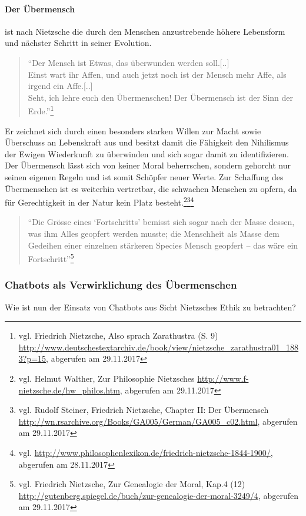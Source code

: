 \paragraph{Der Übermensch} ist nach Nietzsche die durch den Menschen anzustrebende höhere Lebensform und nächster Schritt in seiner Evolution.
\begin{quote}
\enquote{Der Mensch ist Etwas, das überwunden werden soll.[..]\\
Einst wart ihr Affen, und auch jetzt noch ist der Mensch mehr Affe, als irgend ein Affe.[..]\\
Seht, ich lehre euch den Übermenschen! Der Übermensch ist der Sinn der Erde.}\footnote{vgl. Friedrich Nietzsche, Also sprach Zarathustra (S. 9) \url{http://www.deutschestextarchiv.de/book/view/nietzsche_zarathustra01_1883?p=15}, abgerufen am 29.11.2017}
\end{quote}
Er zeichnet sich durch einen besonders starken Willen zur Macht sowie Überschuss an Lebenskraft aus und besitzt damit die Fähigkeit den Nihilismus der Ewigen Wiederkunft zu überwinden und sich sogar damit zu identifizieren.
Der Übermensch lässt sich von keiner Moral beherrschen, sondern gehorcht nur seinen eigenen Regeln und ist somit Schöpfer neuer Werte.
Zur Schaffung des Übermenschen ist es weiterhin vertretbar, die schwachen Menschen zu opfern, da für Gerechtigkeit in der Natur kein Platz besteht.\footnote{vgl. Helmut Walther, Zur Philosophie Nietzsches \url{http://www.f-nietzsche.de/hw_philos.htm}, abgerufen am 29.11.2017}\footnote{vgl. Rudolf Steiner, Friedrich Nietzsche, Chapter II: Der Übermensch \url{http://wn.rsarchive.org/Books/GA005/German/GA005_c02.html}, abgerufen am 29.11.2017}\footnote{vgl. \url{http://www.philosophenlexikon.de/friedrich-nietzsche-1844-1900/}, abgerufen am 28.11.2017}
\begin{quote}
\enquote{Die Grösse eines \enquote{Fortschritts} bemisst sich sogar nach der Masse dessen, was ihm Alles geopfert werden musste; die Menschheit als Masse dem Gedeihen einer einzelnen stärkeren Species Mensch geopfert – das wäre ein Fortschritt}\footnote{vgl. Friedrich Nietzsche, Zur Genealogie der Moral, Kap.4 (12) \url{http://gutenberg.spiegel.de/buch/zur-genealogie-der-moral-3249/4}, abgerufen am 29.11.2017}
\end{quote}

\subsubsection{Chatbots als Verwirklichung des Übermenschen}
Wie ist nun der Einsatz von Chatbots aus Sicht Nietzsches Ethik zu betrachten?

